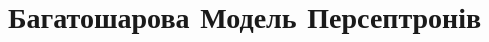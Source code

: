 \documentclass{zkdl-presentation-template}
\begin{document}


    \section{Багатошарова Модель Персептронів}
\end{document}
